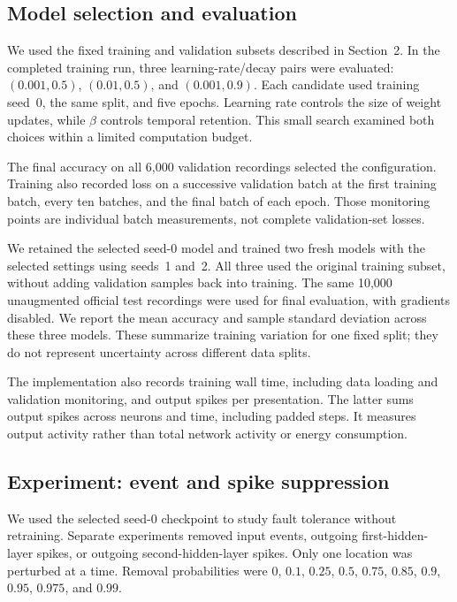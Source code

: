 \subsection{Model selection and evaluation}

We used the fixed training and validation subsets described in Section~2. In the completed training run, three learning-rate/decay pairs were evaluated: $(0.001,0.5)$, $(0.01,0.5)$, and $(0.001,0.9)$. Each candidate used training seed~0, the same split, and five epochs. Learning rate controls the size of weight updates, while $\beta$ controls temporal retention. This small search examined both choices within a limited computation budget.

The final accuracy on all 6,000 validation recordings selected the configuration. Training also recorded loss on a successive validation batch at the first training batch, every ten batches, and the final batch of each epoch. Those monitoring points are individual batch measurements, not complete validation-set losses.

We retained the selected seed-0 model and trained two fresh models with the selected settings using seeds~1 and~2. All three used the original training subset, without adding validation samples back into training. The same 10,000 unaugmented official test recordings were used for final evaluation, with gradients disabled. We report the mean accuracy and sample standard deviation across these three models. These summarize training variation for one fixed split; they do not represent uncertainty across different data splits.

The implementation also records training wall time, including data loading and validation monitoring, and output spikes per presentation. The latter sums output spikes across neurons and time, including padded steps. It measures output activity rather than total network activity or energy consumption.

\subsection{Experiment: event and spike suppression}

We used the selected seed-0 checkpoint to study fault tolerance without retraining. Separate experiments removed input events, outgoing first-hidden-layer spikes, or outgoing second-hidden-layer spikes. Only one location was perturbed at a time. Removal probabilities were $0$, $0.1$, $0.25$, $0.5$, $0.75$, $0.85$, $0.9$, $0.95$, $0.975$, and $0.99$.

